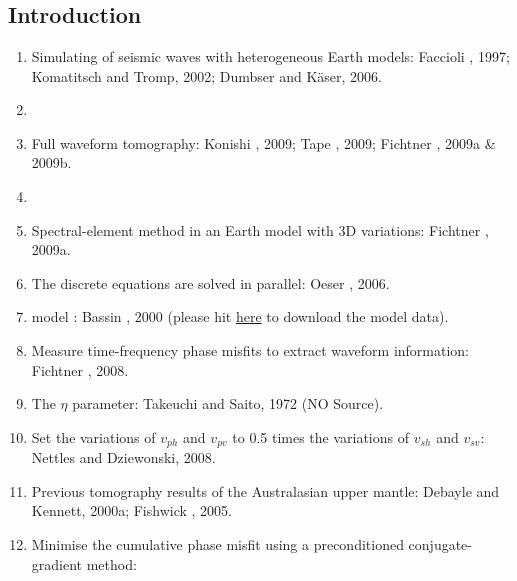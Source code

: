 \renewcommand{\pmk}{Fichtner\_2010\_EPSL\_Full waveform tomography}
\renewcommand{\prf}{FWI/\pmk.pdf}
\renewcommand{\pti}{Full waveform tomography for radially anisotropic structure:
New insights into present and past states of the Australasian upper mantle}
\renewcommand{\pay}{Andreas Fichtner, Brian L. N. Kennett and Heiner Igel \etal, 2010}
\renewcommand{\pjo}{Earth and Planetary Science Letters}
\renewcommand{\pda}{2016/10/13 Thu.}

\section{\pinfo}
\subsection{Introduction}
\begin{enumerate}[\hspace{10mm}*]
  \item Simulating of seismic waves with heterogeneous Earth models: Faccioli \etal, 1997;
    Komatitsch and Tromp, 2002; Dumbser and K\"{a}ser, 2006.
  \item \sline
  \item Full waveform tomography: Konishi \etal, 2009; Tape \etal, 2009;
    Fichtner \etal, 2009a \& 2009b.
  \item \sline
  \item Spectral-element method in an Earth model with 3D variations: Fichtner \etal, 2009a.
  \item The discrete equations are solved in parallel: Oeser \etal, 2006.
  \item {} model
    : Bassin \etal, 2000
    (please hit \href{http://igppweb.ucsd.edu/~gabi/crust2.html}{here} to download the model data).
  \item Measure time-frequency phase misfits to extract waveform information: Fichtner \etal, 2008.
  \item The $\eta$ parameter: Takeuchi and Saito, 1972 (NO Source).
  \item Set the variations of $v_{ph}$ and $v_{pv}$ to 0.5 times
    the variations of $v_{sh}$ and $v_{sv}$: Nettles and Dziewonski, 2008.
  \item Previous tomography results of the Australasian upper mantle:
    Debayle and Kennett, 2000a; Fishwick \etal, 2005.
  \item Minimise the cumulative phase misfit using a preconditioned conjugate-gradient method:

\end{enumerate}
